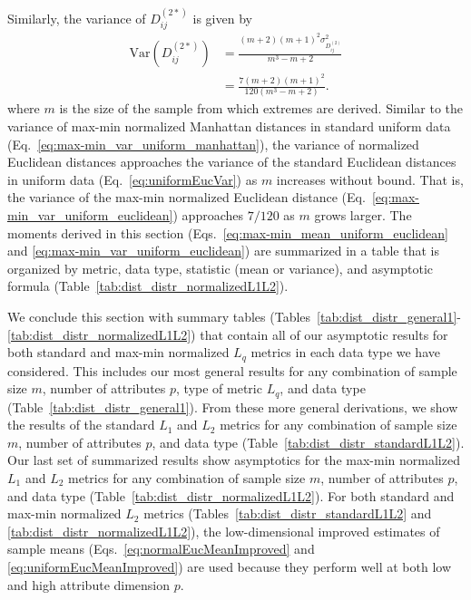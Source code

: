 \documentclass[aos]{imsart}
\begin{document}
Similarly, the variance of $D^{(2*)}_{ij}$ is given by
%
\begin{equation}\label{eq:max-min_var_uniform_euclidean}
\begin{aligned}
\text{Var}\left(D^{(2*)}_{ij}\right) &= \frac{(m+2)(m+1)^2\sigma^2_{D^{(2)}_{ij}}}{m^3 - m + 2} \\
&= \frac{7(m+2)(m+1)^2}{120(m^3 - m + 2)}.
\end{aligned}
\end{equation}
%
where $m$ is the size of the sample from which extremes are derived. Similar to the variance of max-min normalized Manhattan distances in standard uniform data (Eq.~\ref{eq:max-min_var_uniform_manhattan}), the variance of normalized Euclidean distances approaches the variance of the standard Euclidean distances in uniform data (Eq.~\ref{eq:uniformEucVar}) as $m$ increases without bound. That is, the variance of the max-min normalized Euclidean distance (Eq.~\ref{eq:max-min_var_uniform_euclidean}) approaches $7/120$ as $m$ grows larger. The moments derived in this section (Eqs.~\ref{eq:max-min_mean_uniform_euclidean} and \ref{eq:max-min_var_uniform_euclidean}) are summarized in a table that is organized by metric, data type, statistic (mean or variance), and asymptotic formula (Table~\ref{tab:dist_distr_normalizedL1L2}).

We conclude this section with summary tables (Tables~\ref{tab:dist_distr_general1}-\ref{tab:dist_distr_normalizedL1L2}) that contain all of our asymptotic results for both standard and max-min normalized $L_q$ metrics in each data type we have considered. This includes our most general results for any combination of sample size $m$, number of attributes $p$, type of metric $L_q$, and data type (Table~\ref{tab:dist_distr_general1}). From these more general derivations, we show the results of the standard $L_1$ and $L_2$ metrics for any combination of sample size $m$, number of attributes $p$, and data type (Table~\ref{tab:dist_distr_standardL1L2}). Our last set of summarized results show asymptotics for the max-min normalized $L_1$ and $L_2$ metrics for any combination of sample size $m$, number of attributes $p$, and data type (Table~\ref{tab:dist_distr_normalizedL1L2}). For both standard and max-min normalized $L_2$ metrics (Tables~\ref{tab:dist_distr_standardL1L2} and \ref{tab:dist_distr_normalizedL1L2}), the low-dimensional improved estimates of sample means (Eqs.~\ref{eq:normalEucMeanImproved} and \ref{eq:uniformEucMeanImproved}) are used because they perform well at both low and high attribute dimension $p$.
\end{document}
